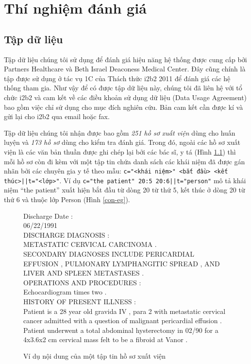\chapter{Thí nghiệm đánh giá}
\section{Tập dữ liệu}
Tập dữ liệu chúng tôi sử dụng để đánh giá hiệu năng hệ thống được cung cấp bởi Partners Healthcare và Beth Israel Deaconess Medical Center. Đây cũng chính là tập được sử dụng ở tác vụ 1C của Thách thức i2b2 2011 để đánh giá các hệ thống tham gia. Như vậy để có được tập dữ liệu này, chúng tôi đã liên hệ với tổ chức i2b2 và cam kết về các điều khoản sử dụng dữ liệu (Data Usage Agreement) bao gồm việc chỉ sử dụng cho mục đích nghiên cứu. Bản cam kết cần được kí và gửi lại cho i2b2 qua email hoặc fax.

Tập dữ liệu chúng tôi nhận được bao gồm \emph{251 hồ sơ xuất viện} dùng cho huấn luyện và \emph{173 hồ sơ} dùng cho kiểm tra đánh giá. Trong đó, ngoài các hồ sơ xuất viện là các văn bản thuần được ghi chép lại bởi các bác sĩ, y tá (Hình \ref{hsxv-eg}) thì mỗi hồ sơ còn đi kèm với một tập tin chứa danh sách các khái niệm đã được gán nhãn bởi các chuyên gia y tế theo mẫu: \texttt{c="<khái niệm>" <bắt đầu> <kết thúc>||t="<lớp>"}. Ví dụ \texttt{c="the patient" 20:5 20:6||t="person"} mô tả khái niệm ``the patient'' xuất hiện bắt đầu từ dòng 20 từ thứ 5, kết thúc ở dòng 20 từ thứ 6 và thuộc lớp Person (Hình \ref{con-eg}).

\begin{figure}[ht]
\begin{mdframed}
\ttfamily\footnotesize
\protect\raggedright
Discharge Date :\\
06/22/1991\\
DISCHARGE DIAGNOSIS :\\
METASTATIC CERVICAL CARCINOMA .\\
SECONDARY DIAGNOSES INCLUDE PERICARDIAL EFFUSION , PULMONARY LYMPHANGITIC SPREAD , AND LIVER AND SPLEEN METASTASES .\\
OPERATIONS AND PROCEDURES :\\
Echocardiogram times two .\\
HISTORY OF PRESENT ILLNESS :\\
Patient is a 28 year old gravida IV , para 2 with metastatic cervical cancer admitted with a question of malignant pericardial effusion .\\
Patient underwent a total abdominal hysterectomy in 02/90 for a 4x3.6x2 cm cervical mass felt to be a fibroid at Vanor .
\end{mdframed}
\caption{Ví dụ nội dung của một tập tin hồ sơ xuất viện\label{hsxv-eg}}
\end{figure}

